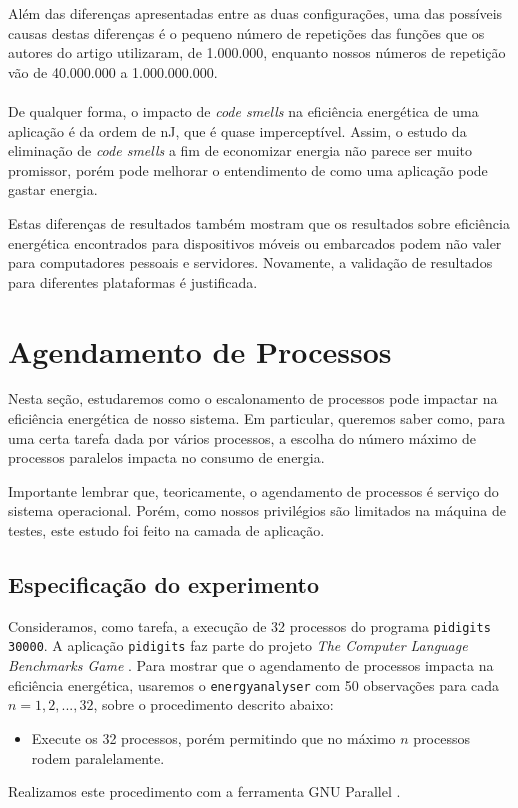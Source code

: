Além das diferenças apresentadas entre as duas configurações, uma das possíveis causas destas diferenças é o pequeno número de repetições das funções que os autores do artigo utilizaram, de 1.000.000, enquanto nossos números de repetição vão de 40.000.000 a 1.000.000.000. \\\\

De qualquer forma, o impacto de \emph{code smells} na eficiência energética de uma aplicação é da ordem de nJ, que é quase imperceptível. Assim, o estudo da eliminação de \emph{code smells} a fim de economizar energia não parece ser muito promissor, porém pode melhorar o entendimento de como uma aplicação pode gastar energia.

Estas diferenças de resultados também mostram que os resultados sobre eficiência energética encontrados para dispositivos móveis ou embarcados podem não valer para computadores pessoais e servidores. Novamente, a validação de resultados para diferentes plataformas é justificada.

\section{Agendamento de Processos}
Nesta seção, estudaremos como o escalonamento de processos pode impactar na eficiência energética de nosso sistema. Em particular, queremos saber como, para uma certa tarefa dada por vários processos, a escolha do número máximo de processos paralelos impacta no consumo de energia.

Importante lembrar que, teoricamente, o agendamento de processos é serviço do sistema operacional. Porém, como nossos privilégios são limitados na máquina de testes, este estudo foi feito na camada de aplicação.

\subsection{Especificação do experimento}
Consideramos, como tarefa, a execução de 32 processos do programa {\tt pidigits 30000}. A aplicação {\tt pidigits} faz parte do projeto \emph{The Computer Language Benchmarks Game} \cite{benchgame}. Para mostrar que o agendamento de processos impacta na eficiência energética, usaremos o {\tt energyanalyser} com 50 observações para cada $ n = 1, 2, ..., 32 $, sobre o procedimento descrito abaixo:

\begin{itemize}

\item Execute os 32 processos, porém permitindo que no máximo $ n $ processos rodem paralelamente.

\end{itemize}
Realizamos este procedimento com a ferramenta GNU Parallel \cite{tange2011gnu}. \\

